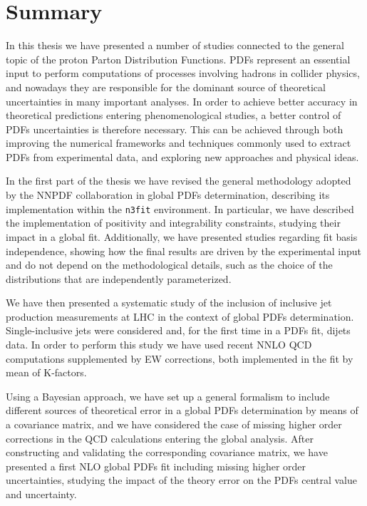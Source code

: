 \chapter{Summary}
\label{ch:conclusions}
In this thesis we have presented a number of studies connected to the general topic of the proton Parton Distribution Functions.
PDFs represent an essential input to perform computations of processes involving hadrons in collider physics, and nowadays
they are responsible for the dominant source of theoretical uncertainties in many important analyses.
In order to achieve better accuracy in theoretical predictions entering phenomenological studies, 
a better control of PDFs uncertainties is therefore necessary. This can be achieved through both
improving the numerical frameworks and techniques commonly used to extract PDFs from experimental data, 
and exploring new approaches and physical ideas. 

%
In the first part of the thesis we have revised the general methodology adopted by the NNPDF collaboration in 
global PDFs determination, describing its implementation within the {\tt n3fit} environment. In particular,
we have described the implementation of positivity and integrability constraints, studying their impact in
a global fit. Additionally, we have presented studies regarding fit basis independence, showing how the final results 
are driven by the experimental input and do not depend on the methodological details, such as the choice of the distributions
that are independently parameterized.

%
We have then presented a systematic study of the inclusion of inclusive jet production measurements at LHC in the context of global
PDFs determination. Single-inclusive jets were considered and, for the first time in a PDFs fit, dijets data.
In order to perform this study we have used recent NNLO QCD computations supplemented by EW corrections,
both implemented in the fit by mean of K-factors. 

%
Using a Bayesian approach, we have set up a general formalism to include different sources of theoretical error
in a global PDFs determination by means of a covariance matrix,
and we have considered the case of missing higher order corrections in the QCD calculations entering the global analysis.
After constructing and validating the corresponding covariance matrix, we have presented a first NLO global PDFs fit 
including missing higher order uncertainties, studying the impact of the theory error on the PDFs central value and uncertainty.

